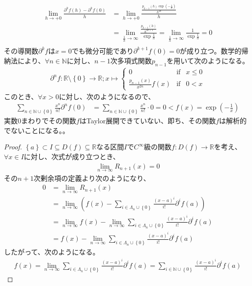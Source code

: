 \documentclass[dvipdfmx]{jsarticle}
\begin{document}
\begin{dfn}
{\begin{align*}
  \lim_{h\rightarrow+0} \frac{\partial^k f\left( h\right) -\partial^k f\left( 0\right) }{h} &= \lim_{h\rightarrow+0} \frac{\frac{p_{k-1} \left(h\right) \exp \left( -\frac{1}{h}\right)}{h^{2k}}}{h} \\
  &= \lim_{\frac{1}{h}\rightarrow \infty } \frac{\frac{p_{k-1} \left(h\right) }{h^{2k+1}}}{\exp \frac{1}{h} } = \lim_{\frac{1}{h}\rightarrow \infty } \frac{1}{\exp \frac{1}{h} } = 0 \\
\end{align*}
その導関数$\partial^k f$は$x=0$でも微分可能であり$\partial^{k+1} f \left(0\right) =0$が成り立つ。数学的帰納法により、$\forall n\in \mathbb{N}$に対し、$n-1$次多項式関数$p_{n-1} $を用いて次のようになる。
\begin{align*}
  \partial^n f:\mathbb{R}\setminus \left\{ 0\right\} \rightarrow \mathbb{R} ; x \mapsto \left\{ \begin{matrix}
    0 & \mathrm{if} & x \leq 0 \\
    \frac{p_{n-1} \left(x \right) }{x^{2n }} f\left( x\right) & \mathrm{if} & 0 < x
  \end{matrix} \right. 
\end{align*}
このとき、$\forall x >0$に対し、次のようになるので、
\begin{align*}
  \sum_{n \in \mathbb{N} \cup \left\{ 0 \right\}} {\frac{x^{n}}{n!}\partial^{n}f(0)} &= \sum_{n \in \mathbb{N} \cup \left\{ 0 \right\}} {\frac{x^{n}}{n!} \cdot 0} =0 < f\left(x\right) =\exp \left( -\frac{1}{x}\right)
\end{align*}
実数$0$まわりでその関数$f$はTaylor展開できていない、即ち、その関数$f$は解析的でないことになる。}。
\end{dfn}
\begin{proof}
$\left\{ a \right\} \subset I \subseteq D(f) \subseteq \mathbb{R}$なる区間$I$で$C^{\infty}$級の関数$f:D(f) \rightarrow \mathbb{R}$を考え、$\forall x \in I$に対し、次式が成り立つとき、
\begin{align*}
\lim_{n \rightarrow \infty}{R_{n + 1}(x)} = 0
\end{align*}
その$n + 1$次剰余項の定義より次のようになり、
\begin{align*}
0 &= \lim_{n \rightarrow \infty}{R_{n + 1}(x)}\\
&= \lim_{n \rightarrow \infty}\left( f(x) - \sum_{i \in \varLambda_{n} \cup \left\{ 0 \right\}} {\frac{(x - a)^{i}}{i!}\partial^{i}f(a)} \right)\\
&= \lim_{n \rightarrow \infty}{f(x)} - \lim_{n \rightarrow \infty}{\sum_{i \in \varLambda_{n} \cup \left\{ 0 \right\}} {\frac{(x - a)^{i}}{i!}\partial^{i}f(a)}}\\
&= f(x) - \lim_{n \rightarrow \infty}{\sum_{i \in \varLambda_{n} \cup \left\{ 0 \right\}} {\frac{(x - a)^{i}}{i!}\partial^{i}f(a)}}
\end{align*}
したがって、次のようになる。
\begin{align*}
f(x) = \lim_{n \rightarrow \infty}{\sum_{i \in \varLambda_{n} \cup \left\{ 0 \right\}} {\frac{(x - a)^{i}}{i!}\partial^{i}f(a)}} = \sum_{i \in \mathbb{N} \cup \left\{ 0 \right\}} {\frac{(x - a)^{i}}{i!}\partial^{i}f(a)}
\end{align*}
\end{proof}
\end{document}
